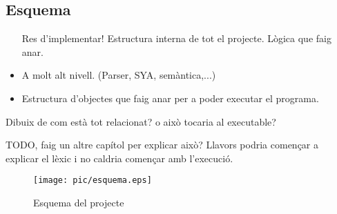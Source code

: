 \subsection{Esquema}
{\color{blue}
\begin{itemize}
    \item[Res d'implementar!] Estructura interna de tot el projecte. Lògica que faig anar.
    \item A molt alt nivell. (Parser, SYA, semàntica,...)
    \item Estructura d'objectes que faig anar per a poder executar el programa.
\end{itemize}
Dibuix de com està tot relacionat? o això tocaria al executable?
}



{\color{blue}
TODO, faig un altre capítol per explicar això?
Llavors podria començar a explicar el lèxic i no caldria començar amb l'execució.
}
\begin{figure}[H]
    \centering
    \texttt{[image: pic/esquema.eps]}
    \caption{Esquema del projecte}
    \label{fig:esquema}
\end{figure}
